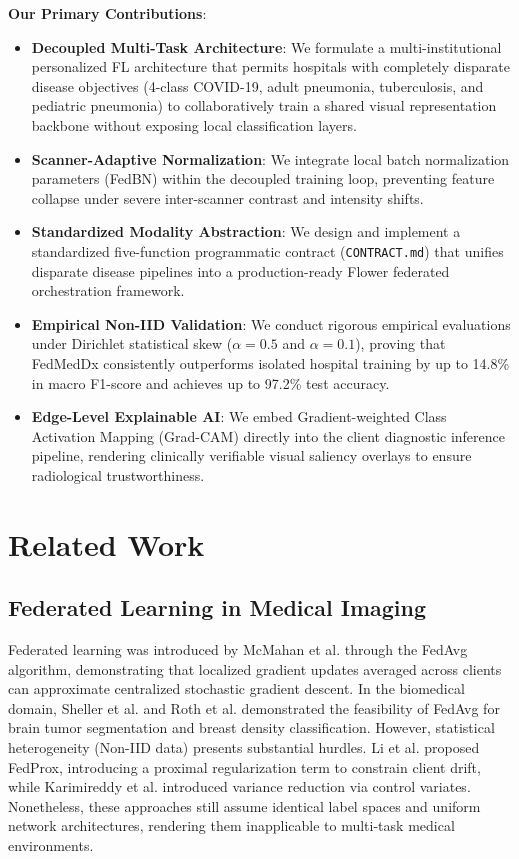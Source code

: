 \documentclass[conference]{IEEEtran}
\newcommand{\compactitems}{%
  \setlength{\itemsep}{1.2pt}%
  \setlength{\parskip}{0pt}%
  \setlength{\parsep}{0pt}%
  \setlength{\topsep}{2pt}%
  \setlength{\partopsep}{0pt}%
}
\begin{document}
\textbf{Our Primary Contributions}:
\begin{itemize}\compactitems
    \item \textbf{Decoupled Multi-Task Architecture}: We formulate a multi-institutional personalized FL architecture that permits hospitals with completely disparate disease objectives (4-class COVID-19, adult pneumonia, tuberculosis, and pediatric pneumonia) to collaboratively train a shared visual representation backbone without exposing local classification layers.
    \item \textbf{Scanner-Adaptive Normalization}: We integrate local batch normalization parameters (FedBN) within the decoupled training loop, preventing feature collapse under severe inter-scanner contrast and intensity shifts.
    \item \textbf{Standardized Modality Abstraction}: We design and implement a standardized five-function programmatic contract (\texttt{CONTRACT.md}) that unifies disparate disease pipelines into a production-ready Flower federated orchestration framework.
    \item \textbf{Empirical Non-IID Validation}: We conduct rigorous empirical evaluations under Dirichlet statistical skew ($\alpha = 0.5$ and $\alpha = 0.1$), proving that FedMedDx consistently outperforms isolated hospital training by up to 14.8\% in macro F1-score and achieves up to 97.2\% test accuracy.
    \item \textbf{Edge-Level Explainable AI}: We embed Gradient-weighted Class Activation Mapping (Grad-CAM) directly into the client diagnostic inference pipeline, rendering clinically verifiable visual saliency overlays to ensure radiological trustworthiness.
\end{itemize}

\section{Related Work}

\subsection{Federated Learning in Medical Imaging}
Federated learning was introduced by McMahan et al. \cite{mcmahan2017communication} through the FedAvg algorithm, demonstrating that localized gradient updates averaged across clients can approximate centralized stochastic gradient descent. In the biomedical domain, Sheller et al. \cite{sheller2020federated} and Roth et al. \cite{roth2020federated} demonstrated the feasibility of FedAvg for brain tumor segmentation and breast density classification. However, statistical heterogeneity (Non-IID data) presents substantial hurdles. Li et al. \cite{li2020federated} proposed FedProx, introducing a proximal regularization term to constrain client drift, while Karimireddy et al. \cite{karimireddy2020scaffold} introduced variance reduction via control variates. Nonetheless, these approaches still assume identical label spaces and uniform network architectures, rendering them inapplicable to multi-task medical environments.
\end{document}
